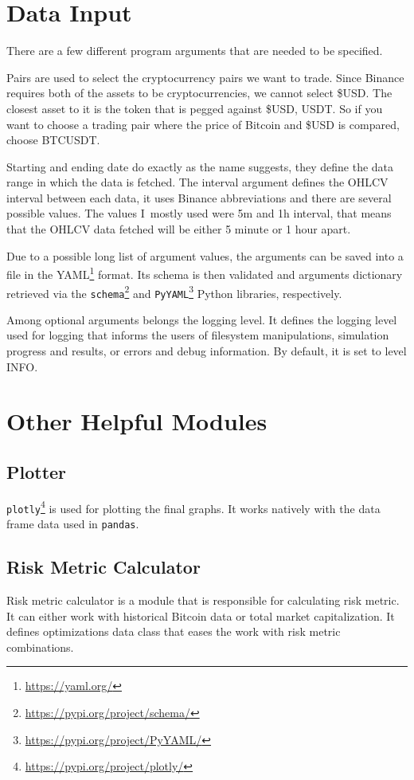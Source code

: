 \section{Data Input}
There are a few different program arguments that are needed to be specified.

Pairs are used to select the cryptocurrency pairs we want to trade. Since Binance requires both of the assets to be cryptocurrencies, we cannot select \$USD. The closest asset to it is the token that is pegged against \$USD, USDT. So if you want to choose a trading pair where the price of Bitcoin and \$USD is compared, choose BTCUSDT.

Starting and ending date do exactly as the name suggests, they define the data range in which the data is fetched. The interval argument defines the OHLCV interval between each data, it uses Binance abbreviations and there are several possible values. The values I~mostly used were 5m and 1h interval, that means that the OHLCV data fetched will be either 5 minute or 1 hour apart.

Due to a possible long list of argument values, the arguments can be saved into a file in the YAML\footnote{\url{https://yaml.org/}} format. Its schema is then validated and arguments dictionary retrieved via the \texttt{schema}\footnote{\url{https://pypi.org/project/schema/}} and \texttt{PyYAML}\footnote{\url{https://pypi.org/project/PyYAML/}} Python libraries, respectively.

Among optional arguments belongs the logging level. It defines the logging level used for logging that informs the users of filesystem manipulations, simulation progress and results, or errors and debug information. By default, it is set to level INFO.

\section{Other Helpful Modules}

\subsection*{Plotter}
\texttt{plotly}\footnote{\url{https://pypi.org/project/plotly/}} is used for plotting the final graphs. It works natively with the data frame data used in \texttt{pandas}.

\subsection*{Risk Metric Calculator}
Risk metric calculator is a module that is responsible for calculating risk metric. It can either work with historical Bitcoin data or total market capitalization. It defines optimizations data class that eases the work with risk metric combinations.

